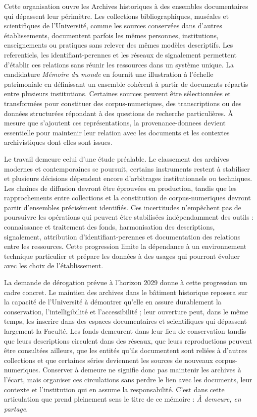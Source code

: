 Cette organisation ouvre les Archives historiques à des ensembles documentaires qui dépassent leur périmètre. Les collections bibliographiques, muséales et scientifiques de l'Université, comme les sources conservées dans d'autres établissements, documentent parfois les mêmes personnes, institutions, enseignements ou pratiques sans relever des mêmes modèles descriptifs. Les \glspl{referentiel}, les \glspl{identifiant-perenne} et les réseaux de \gls{signalement} permettent d'établir ces relations sans réunir les ressources dans un système unique. La candidature \emph{Mémoire du monde} en fournit une illustration à l'échelle patrimoniale en définissant un ensemble cohérent à partir de documents répartis entre plusieurs institutions. Certaines sources peuvent être sélectionnées et transformées pour constituer des \glspl{corpus-numerique}, des transcriptions ou des données structurées répondant à des questions de recherche particulières. À mesure que s'ajoutent ces représentations, la \gls{provenance-donnees} devient essentielle pour maintenir leur relation avec les documents et les contextes archivistiques dont elles sont issues.

Le travail demeure celui d'une étude préalable. Le classement des archives modernes et contemporaines se poursuit, certains instruments restent à stabiliser et plusieurs décisions dépendent encore d'arbitrages institutionnels ou techniques. Les chaînes de diffusion devront être éprouvées en production, tandis que les rapprochements entre collections et la constitution de \glspl{corpus-numerique} devront partir d'ensembles précisément identifiés. Ces incertitudes n'empêchent pas de poursuivre les opérations qui peuvent être stabilisées indépendamment des outils : connaissance et traitement des fonds, harmonisation des descriptions, \gls{signalement}, attribution d'\glspl{identifiant-perenne} et documentation des relations entre les ressources. Cette progression limite la dépendance à un environnement technique particulier et prépare les données à des usages qui pourront évoluer avec les choix de l'établissement.

La demande de dérogation prévue à l'horizon 2029 donne à cette progression un cadre concret. Le maintien des archives dans le bâtiment historique reposera sur la capacité de l'Université à démontrer qu'elle en assure durablement la conservation, l'intelligibilité et l'accessibilité ; leur ouverture peut, dans le même temps, les inscrire dans des espaces documentaires et scientifiques qui dépassent largement la Faculté. Les fonds demeurent dans leur lieu de conservation tandis que leurs descriptions circulent dans des réseaux, que leurs reproductions peuvent être consultées ailleurs, que les entités qu'ils documentent sont reliées à d'autres collections et que certaines séries deviennent les sources de nouveaux \glspl{corpus-numerique}. Conserver à demeure ne signifie donc pas maintenir les archives à l'écart, mais organiser ces circulations sans perdre le lien avec les documents, leur contexte et l'institution qui en assume la responsabilité. C'est dans cette articulation que prend pleinement sens le titre de ce mémoire : \emph{À demeure, en partage}.